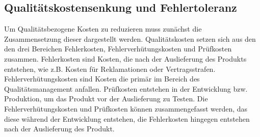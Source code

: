 \subsection{Qualitätskostensenkung und Fehlertoleranz}
Um Qualitätsbezogene Kosten zu reduzieren muss zunächst die Zusammensetzung dieser dargestellt werden.
Qualitätskosten setzen sich aus den den drei Bereichen Fehlerkosten, Fehlerverhütungskosten und Prüfkosten zusammen.
Fehlerkosten sind Kosten, die nach der Auslieferung des Produkts entstehen, wie z.B. Kosten für Reklamationen oder Vertragsstrafen.
Fehlerverhütungskosten sind Kosten die primär im Bereich des Qualitätsmanagement anfallen.
Prüfkosten entstehen in der Entwicklung bzw. Produktion, um das Produkt vor der Auslieferung zu Testen.
Die Fehlerverhütungskosten und Prüfkosten können zusammengefasst werden, das diese während der Entwicklung entstehen, die Fehlerkosten hingegen entstehen nach der Auslieferung des Produkt.
\newparagraph
